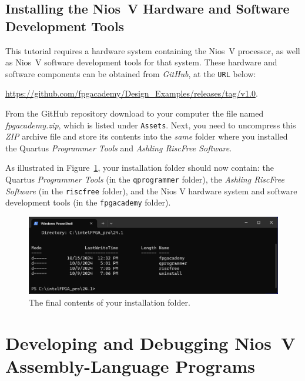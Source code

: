 \documentclass[11pt, twoside, pdftex]{article}
\begin{document}
\subsection{Installing the Nios~V Hardware and Software Development Tools}
\label{sec:hw_sw}

This tutorial requires a hardware system containing the Nios~V processor, as well as Nios~V
software development tools for that system. These hardware and software components can be
obtained from {\it GitHub}, at the \texttt{URL} below:

{\href{https://github.com/fpgacademy/Design\_Examples/releases/tag/v1.0} 
{https://github.com/fpgacademy/Design\_Examples/releases/tag/v1.0}.

From the GitHub repository download to your computer the file named {\it fpgacademy.zip}, 
which is listed under \texttt{Assets}. Next, you need to uncompress this {\it ZIP} archive 
file and store its contents into the {\it same} folder where you installed the Quartus 
{\it Programmer Tools} and {\it Ashling RiscFree Software}.

As illustrated in Figure~\ref{fig:goterdone}, your installation folder should now 
contain: the Quartus {\it Programmer Tools} (in the \texttt{qprogrammer} folder), the 
{\it Ashling RiscFree Software} (in the \texttt{riscfree} folder), and the Nios V 
hardware system and software development tools (in the \texttt{fpgacademy} folder).
~\\
\begin{figure}[h]
    \begin{center}
        \includegraphics[width=.9\linewidth]{figures/goterdone.png}
        \caption{The final contents of your installation folder.}
        \label{fig:goterdone}
    \end{center}
\end{figure}

\section{Developing and Debugging Nios~V Assembly-Language Programs}
\label{sec:assembly}

}
\end{document}
